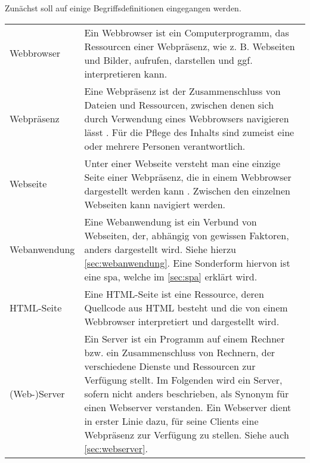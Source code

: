 Zunächst soll auf einige Begriffsdefinitionen eingegangen werden.
\begin{longtable}{| p{} | p{} |} 
	\hline 
	\thead{Begriff} & \thead{Definition} \\ 
	\hline 
	Webbrowser & Ein Webbrowser ist ein Computerprogramm, das Ressourcen einer Webpräsenz, wie z. B. Webseiten und Bilder, aufrufen, darstellen und ggf. interpretieren kann.
	\\ 
\hline 
Webpräsenz & Eine Webpräsenz ist der Zusammenschluss von Dateien und Ressourcen, zwischen denen sich durch Verwendung eines Webbrowsers navigieren lässt \cite[S. 30]{JacobsenGidda2016}. Für die Pflege des Inhalts sind zumeist eine oder mehrere Personen verantwortlich. \\ 

\hline 
Webseite & Unter einer Webseite versteht man eine einzige Seite einer Webpräsenz, die in einem Webbrowser dargestellt werden kann \cite[S. 30]{JacobsenGidda2016}. Zwischen den einzelnen Webseiten kann navigiert werden.
\\ 

\hline 
Webanwendung & Eine Webanwendung ist ein Verbund von Webseiten, der, abhängig von gewissen Faktoren, anders dargestellt wird. Siehe hierzu \autoref{sec:webanwendung}. Eine Sonderform hiervon ist eine \ac{spa}, welche im \autoref{sec:spa} erklärt wird.
\\ 


\hline
HTML-Seite & Eine HTML-Seite ist eine Ressource, deren Quellcode aus HTML besteht und die von einem Webbrowser interpretiert und dargestellt wird.
\\

\hline 
(Web-)Server & Ein Server ist ein Programm auf einem Rechner bzw. ein Zusammenschluss von Rechnern, der verschiedene Dienste und Ressourcen zur Verfügung stellt. Im Folgenden wird ein Server, sofern nicht anders beschrieben, als Synonym für einen Webserver verstanden. Ein Webserver dient in erster Linie dazu, für seine Clients eine Webpräsenz zur Verfügung zu stellen. Siehe auch \autoref{sec:webserver}.
\\ 


\end{longtable}
